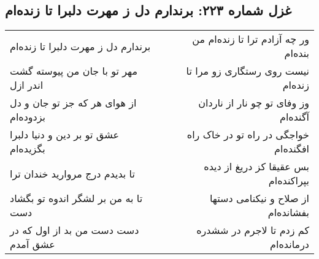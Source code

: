 \begin{center}
\section*{غزل شماره ۲۲۳: برندارم دل ز مهرت دلبرا تا زنده‌ام}
\label{sec:223}
\begin{longtable}{l p{0.5cm} r}
برندارم دل ز مهرت دلبرا تا زنده‌ام
&&
ور چه آزادم ترا تا زنده‌ام من بنده‌ام
\\
مهر تو با جان من پیوسته گشت اندر ازل
&&
نیست روی رستگاری زو مرا تا زنده‌ام
\\
از هوای هر که جز تو جان و دل بزدوده‌ام
&&
وز وفای تو چو نار از ناردان آگنده‌ام
\\
عشق تو بر دین و دنیا دلبرا بگزیده‌ام
&&
خواجگی در راه تو در خاک راه افگنده‌ام
\\
تا بدیدم درج مروارید خندان ترا
&&
بس عقیقا کز دریغ از دیده بپراکنده‌ام
\\
تا به من بر لشگر اندوه تو بگشاد دست
&&
از صلاح و نیکنامی دستها بفشانده‌ام
\\
دست دست من بد از اول که در عشق آمدم
&&
کم زدم تا لاجرم در ششدره درمانده‌ام
\\
\end{longtable}
\end{center}
